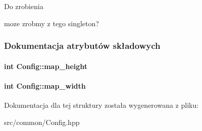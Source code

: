 \begin{DoxyRefDesc}{Do zrobienia}
\item[\hyperlink{todo__todo000001}{Do zrobienia}]moze zrobmy z tego singleton? \end{DoxyRefDesc}


\subsubsection{Dokumentacja atrybutów składowych}
\hypertarget{structConfig_a2ab1bfe7f4004dfb2082204638493b55}{
\paragraph[{map\-\_\-height}]{\setlength{\rightskip}{0pt plus 5cm}int Config\-::map\-\_\-height}}\label{structConfig_a2ab1bfe7f4004dfb2082204638493b55}
\hypertarget{structConfig_ac4596f9cbfcf2ab612ef32c4a6fbb21d}{
\paragraph[{map\-\_\-width}]{\setlength{\rightskip}{0pt plus 5cm}int Config\-::map\-\_\-width}}\label{structConfig_ac4596f9cbfcf2ab612ef32c4a6fbb21d}


Dokumentacja dla tej struktury została wygenerowana z pliku\-:\begin{DoxyCompactItemize}
\item 
src/common/Config.\-hpp\end{DoxyCompactItemize}

